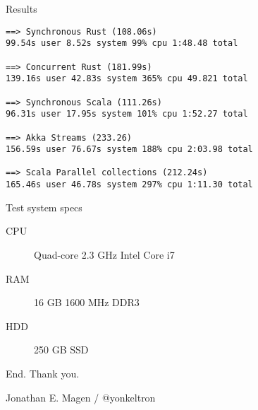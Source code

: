 \documentclass[aspectratio=169,14pt]{beamer}
\newcommand{\megatext}[1]{
  \begin{center}
    \Huge
    #1
  \end{center}
}
\begin{document}
\begin{frame}[fragile]{Results}
  \small
  \begin{verbatim}
==> Synchronous Rust (108.06s)
99.54s user 8.52s system 99% cpu 1:48.48 total

==> Concurrent Rust (181.99s)
139.16s user 42.83s system 365% cpu 49.821 total

==> Synchronous Scala (111.26s)
96.31s user 17.95s system 101% cpu 1:52.27 total

==> Akka Streams (233.26)
156.59s user 76.67s system 188% cpu 2:03.98 total

==> Scala Parallel collections (212.24s)
165.46s user 46.78s system 297% cpu 1:11.30 total
  \end{verbatim}
\end{frame}


\begin{frame}{Test system specs}
  \begin{description}
  \item[CPU] Quad-core 2.3 GHz Intel Core i7
  \item[RAM] 16 GB 1600 MHz DDR3
  \item[HDD] 250 GB SSD
  \end{description}
\end{frame}


\begin{frame}
  \megatext{End. Thank you.}
  \Large
  \centering
  Jonathan E. Magen /  @yonkeltron
\end{frame}
\end{document}

